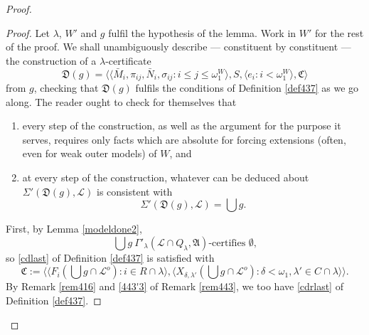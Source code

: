 \documentclass[12pt, twoside]{memoir}
\numberwithin{equation}{section}
\theoremstyle{definition}
\theoremstyle{remark}
\theoremstyle{definition}
\theoremstyle{definition}
\theoremstyle{definition}
\theoremstyle{remark}
\begin{document}
\begin{proof}
\begin{proof}
Let $\lambda$, $W'$ and $g$ fulfil the hypothesis of the lemma. Work in $W'$ for the rest of the proof. We shall unambiguously describe --- constituent by constituent --- the construction of a $\lambda$-certificate
\begin{equation*}
    \mathfrak{D}(g) = \langle \langle \bar{M}_i, \pi_{ij}, \bar{N}_i, \sigma_{ij} : i \leq j \leq \omega_1^{W} \rangle, S, \langle e_i : i < \omega_1^W \rangle, \mathfrak{C} \rangle
\end{equation*}
from $g$, checking that $\mathfrak{D}(g)$ fulfils the conditions of Definition \ref{def437} as we go along. The reader ought to check for themselves that 
\begin{enumerate}[label=(\Roman*)]
    \item every step of the construction, as well as the argument for the purpose it serves, requires only facts which are absolute for forcing extensions (often, even for weak outer models) of $W$, and
    \item at every step of the construction, whatever can be deduced about $\Sigma'(\mathfrak{D}(g), \mathcal{L})$ is consistent with 
    \begin{equation*}
        \Sigma'(\mathfrak{D}(g), \mathcal{L}) = \bigcup g \text{.}
    \end{equation*}
\end{enumerate}

First, by Lemma \ref{modeldone2}, 
\begin{equation*}
    \bigcup g \ \Gamma'_{\lambda} (\mathcal{L} \cap Q_{\lambda}, \mathfrak{A}) \text{-certifies } \emptyset \text{,}
\end{equation*}
so \ref{cdlast} of Definition \ref{def437} is satisfied with
\begin{equation*}
    \mathfrak{C} := \langle \langle F_i(\bigcup g \cap \mathcal{L}^o) : i \in R \cap \lambda \rangle, \langle X_{\delta, \lambda'}(\bigcup g \cap \mathcal{L}^o) : \delta < \omega_1, \lambda' \in C \cap \lambda \rangle \rangle \text{.}
\end{equation*}
By Remark \ref{rem416} and \ref{443'3} of Remark \ref{rem443}, we too have \ref{cdrlast} of Definition \ref{def437}. 


\end{proof}
\end{proof}
\end{document}
